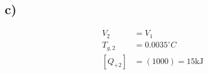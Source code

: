

\subsection*{c)}
\begin{align*}
    V_2 &= V_1 \\
    T_{g,2} &= 0.0035^\circ C \\
    [Q_{+2}] &= (1000) = 15 \text{kJ}
\end{align*}